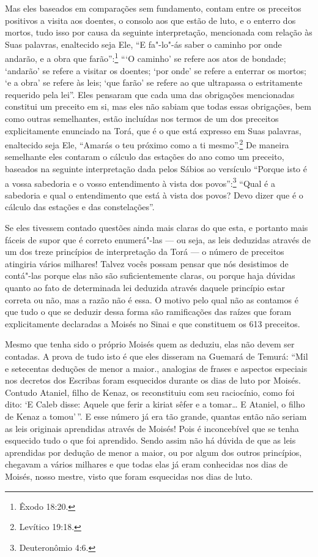 Mas eles baseados em comparações sem fundamento, contam entre os
preceitos positivos a visita aos doentes, o consolo aos que estão de
luto, e o enterro dos mortos, tudo isso por causa da seguinte
interpretação, mencionada com relação às Suas palavras, enaltecido seja
Ele, ``E fa"-lo"-ás saber o caminho por onde andarão, e a obra que
farão'':\footnote{Êxodo 18:20.} ```O caminho' se refere aos atos de bondade;
`andarão' se refere a visitar os doentes; `por onde' se refere a
enterrar os mortos; `e a obra' se refere às leis; `que farão' se refere
ao que ultrapassa o estritamente requerido pela lei''. Eles pensaram que
cada uma das obrigações mencionadas constitui um preceito em si, mas
eles não sabiam que todas essas obrigações, bem como outras
semelhantes, estão incluídas nos termos de um dos preceitos
explicitamente enunciado na Torá\starr, que é o que está expresso em Suas
palavras, enaltecido seja Ele, ``Amarás o teu próximo como a ti mesmo''.\footnote{Levítico 19:18.} De maneira semelhante eles contaram o cálculo das
estações do ano como um preceito, baseados na seguinte interpretação
dada pelos Sábios ao versículo ``Porque isto é a vossa sabedoria e o
vosso entendimento à vista dos povos'':\footnote{Deuteronômio 4:6.} ``Qual é a
sabedoria e qual o entendimento que está à vista dos povos? Devo dizer
que é o cálculo das estações e das constelações''.

Se eles tivessem contado questões ainda mais claras do que esta, e
portanto mais fáceis de supor que é correto enumerá"-las --- ou seja, as
leis deduzidas através de um dos treze princípios de interpretação da
Torá\starr{} --- o número de preceitos atingiria vários milhares! Talvez vocês
possam pensar que nós desistimos de contá"-las porque elas não são
suficientemente claras, ou porque haja dúvidas quanto ao fato de
determinada lei deduzida através daquele princípio estar correta ou não,
mas a razão não é essa. O motivo pelo qual não as contamos é que tudo o
que se deduzir dessa forma são ramificações das raízes que foram
explicitamente declaradas a Moisés no Sinai e que constituem os 613
preceitos.

Mesmo que tenha sido o próprio Moisés quem as deduziu, elas não devem
ser contadas. A prova de tudo isto é que eles disseram na Guemará\starr{} de
Temurá\starr: ``Mil e setecentas deduções de menor a maior., analogias de
frases e aspectos especiais nos decretos dos Escribas foram esquecidos
durante os dias de luto por Moisés. Contudo Ataniel, filho de Kenaz\starr, os
reconstituiu com seu raciocínio, como foi dito: `E Caleb\starr{} disse: Aquele
que ferir a kiriat sêfer\starr{} e a tomar\ldots{} E Ataniel, o filho de Kenaz\starr{} a
tomou'\,''. E esse número já era tão grande, quantas então não seriam as
leis originais aprendidas através de Moisés! Pois é inconcebível que se
tenha esquecido tudo o que foi aprendido. Sendo assim não há dúvida de
que as leis aprendidas por dedução de menor a maior, ou por algum dos
outros princípios, chegavam a vários milhares e que todas elas já eram
conhecidas nos dias de Moisés, nosso mestre, visto que foram esquecidas
nos dias de luto.

